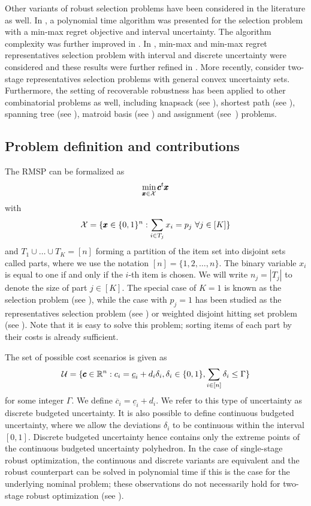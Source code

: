 Other variants of robust selection problems have been considered in the literature as well. In \cite{averbakh2001complexity}, a polynomial time algorithm was presented for the selection problem with a min-max regret objective and interval uncertainty. The algorithm complexity was further improved in \cite{conde2004improved}. In \cite{dolgui2012min}, min-max and min-max regret representatives selection problem with interval and discrete uncertainty were considered and these results were further refined in \cite{deineko2013complexity}. More recently, \cite{goerigk2019robust} consider two-stage representatives selection problems with general convex uncertainty sets. 
Furthermore, the setting of recoverable robustness has been applied to other combinatorial problems as well, including knapsack (see \cite{busing2011recoverable}), shortest path (see \cite{busing2012paths}), spanning tree (see \cite{hradovich2017recoverable-MST}), matroid basis (see \cite{hradovich2017recoverable,lendl2019matroid,iwamasa2021optimal}) and assignment (see~\cite{fischer2020investigation}) problems.


\subsection{Problem definition and contributions}


The RMSP can be formalized as
\[ \min_{\pmb{x}\in\mathcal{X}} \pmb{c}^t \pmb{x} \]
with 
\[ \mathcal{X} = \{ \pmb{x}\in\{0,1\}^n : \sum_{i\in T_j} x_i = p_j\ \forall j\in[K]\} \]
and $T_1 \cup \ldots \cup T_K = [n]$ forming a partition of the item set into disjoint sets called parts, where we use the notation $[n]=\{1,2,\ldots,n\}$. The binary variable $x_i$ is equal to one if and only if the $i$-th item is chosen. We will write $n_j = |T_j|$ to denote the size of part $j\in[K]$. The special case of $K=1$ is known as the selection problem (see \cite{kasperski2015robust}), while the case with $p_j=1$ has been studied as the representatives selection problem (see \cite{kasperski2015approximability}) or weighted disjoint hitting set problem (see \cite{busing2011phd}). Note that it is easy to solve this problem; sorting items of each part by their costs is already sufficient.

The set of possible cost scenarios is given as
\[ \mathcal{U} = \{ \pmb{c}\in\mathbb{R}^n : c_i = \underline{c}_i + d_i \delta_i, \delta_i\in\{0,1\}, \sum_{i\in[n]} \delta_i \le \Gamma \} \]
for some integer $\Gamma$. We define $\overline{c}_i = \underline{c}_i + d_i$.
We refer to this type of uncertainty as discrete budgeted uncertainty. It is also possible to define continuous budgeted uncertainty, where we allow the deviations $\delta_i$ to be continuous within the interval $[0,1]$. Discrete budgeted uncertainty hence contains only the extreme points of the continuous budgeted uncertainty polyhedron. In the case of single-stage robust optimization, the continuous and discrete variants are equivalent and the robust counterpart can be solved in polynomial time if this is the case for the underlying nominal problem; these observations do not necessarily hold for two-stage robust optimization (see \cite{chassein2018recoverable}).

